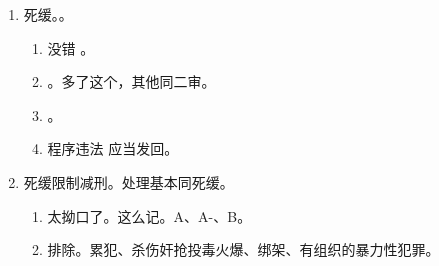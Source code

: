\begin{enumerate}
\begin{enumerate}
\begin{enumerate}
\begin{kk}{死刑复核的发回重审}
\begin{enumerate}
                            \item 若的（二审带复核），可以直接改判，。
                          \end{enumerate}
                        \end{kk}
                \end{enumerate}
          \item 死缓。。
                \begin{enumerate}
                  \item 没错 \yjt {}。
                  \item {}。多了这个，其他同二审。
                  \item {} \yjt {}。
                  \item 程序违法 \yjt 应当发回。
                \end{enumerate}
          \item 死缓限制减刑。处理基本同死缓。
                \begin{enumerate}
                  \item 太拗口了。这么记。A、A-、B。
                  \item 排除。累犯、杀伤奸抢投毒火爆、绑架、有组织的暴力性犯罪。
                \end{enumerate}
        \end{enumerate}
\end{enumerate}
